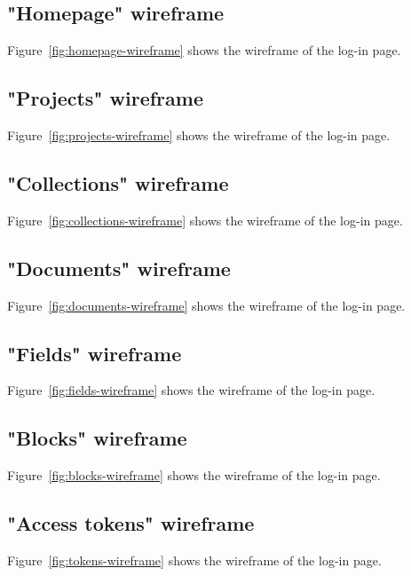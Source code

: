 
\subsection{"Homepage" wireframe}
Figure~\ref{fig:homepage-wireframe} shows the wireframe of the log-in page.


\subsection{"Projects" wireframe}
Figure~\ref{fig:projects-wireframe} shows the wireframe of the log-in page.


\subsection{"Collections" wireframe}
Figure~\ref{fig:collections-wireframe} shows the wireframe of the log-in page.


\subsection{"Documents" wireframe}
Figure~\ref{fig:documents-wireframe} shows the wireframe of the log-in page.


\subsection{"Fields" wireframe}
Figure~\ref{fig:fields-wireframe} shows the wireframe of the log-in page.


\subsection{"Blocks" wireframe}
Figure~\ref{fig:blocks-wireframe} shows the wireframe of the log-in page.


\subsection{"Access tokens" wireframe}
Figure~\ref{fig:tokens-wireframe} shows the wireframe of the log-in page.


